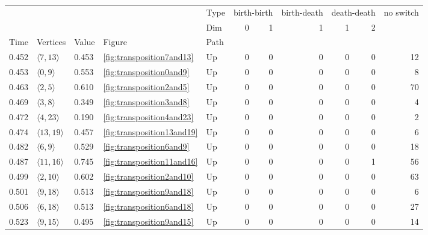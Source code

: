\documentclass{article}
\begin{document}
\begin{center}
\begin{tabular}{lllllrrrrrr}
\toprule
 &  &  &  & Type & \multicolumn{2}{r}{birth-birth} & birth-death & \multicolumn{2}{r}{death-death} & no switch \\
 &  &  &  & Dim & 0 & 1 & 1 & 1 & 2 &  \\
Time & Vertices & Value & Figure & Path &  &  &  &  &  &  \\
\midrule
0.452 & $\langle7, 13\rangle$ & 0.453 & \ref{fig:transposition7and13} & Up & 0 & 0 & 0 & 0 & 0 & 12 \\
\cline{1-11} \cline{2-11} \cline{3-11} \cline{4-11}
0.453 & $\langle0, 9\rangle$ & 0.553 & \ref{fig:transposition0and9} & Up & 0 & 0 & 0 & 0 & 0 & 8 \\
\cline{1-11} \cline{2-11} \cline{3-11} \cline{4-11}
0.463 & $\langle2, 5\rangle$ & 0.610 & \ref{fig:transposition2and5} & Up & 0 & 0 & 0 & 0 & 0 & 70 \\
\cline{1-11} \cline{2-11} \cline{3-11} \cline{4-11}
0.469 & $\langle3, 8\rangle$ & 0.349 & \ref{fig:transposition3and8} & Up & 0 & 0 & 0 & 0 & 0 & 4 \\
\cline{1-11} \cline{2-11} \cline{3-11} \cline{4-11}
0.472 & $\langle4, 23\rangle$ & 0.190 & \ref{fig:transposition4and23} & Up & 0 & 0 & 0 & 0 & 0 & 2 \\
\cline{1-11} \cline{2-11} \cline{3-11} \cline{4-11}
0.474 & $\langle13, 19\rangle$ & 0.457 & \ref{fig:transposition13and19} & Up & 0 & 0 & 0 & 0 & 0 & 6 \\
\cline{1-11} \cline{2-11} \cline{3-11} \cline{4-11}
0.482 & $\langle6, 9\rangle$ & 0.529 & \ref{fig:transposition6and9} & Up & 0 & 0 & 0 & 0 & 0 & 18 \\
\cline{1-11} \cline{2-11} \cline{3-11} \cline{4-11}
0.487 & $\langle11, 16\rangle$ & 0.745 & \ref{fig:transposition11and16} & Up & 0 & 0 & 0 & 0 & 1 & 56 \\
\cline{1-11} \cline{2-11} \cline{3-11} \cline{4-11}
0.499 & $\langle2, 10\rangle$ & 0.602 & \ref{fig:transposition2and10} & Up & 0 & 0 & 0 & 0 & 0 & 63 \\
\cline{1-11} \cline{2-11} \cline{3-11} \cline{4-11}
0.501 & $\langle9, 18\rangle$ & 0.513 & \ref{fig:transposition9and18} & Up & 0 & 0 & 0 & 0 & 0 & 6 \\
\cline{1-11} \cline{2-11} \cline{3-11} \cline{4-11}
0.506 & $\langle6, 18\rangle$ & 0.513 & \ref{fig:transposition6and18} & Up & 0 & 0 & 0 & 0 & 0 & 27 \\
\cline{1-11} \cline{2-11} \cline{3-11} \cline{4-11}
0.523 & $\langle9, 15\rangle$ & 0.495 & \ref{fig:transposition9and15} & Up & 0 & 0 & 0 & 0 & 0 & 14 \\

\end{tabular}
\end{center}
\end{document}
